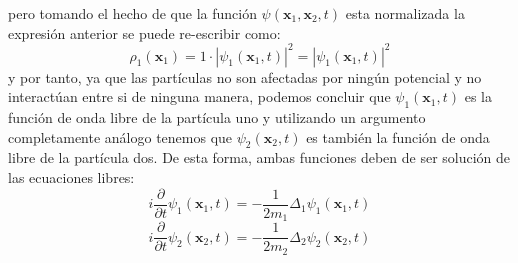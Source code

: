 \documentclass[12pt]{book}
\numberwithin{equation}{chapter}
\def\x{\mathbf{x}}
\begin{document}
pero tomando el hecho de que la funci\'on $\psi( \x_{1},\x_{2},t )$ esta normalizada la expresi\'on anterior se puede re-escribir como:
\begin{equation}
\rho_{1}(\x_{1})= 1 \cdot |\psi_{1}(\x_{1},t)|^{2} = |\psi_{1}(\x_{1},t)|^{2}
\end{equation}
y por tanto, ya que las part\'iculas no son afectadas por ning\'un potencial y no interact\'uan entre si de ninguna manera, podemos concluir que $\psi_{1}(\x_{1},t)$ es la funci\'on de onda libre de la part\'icula uno y utilizando un argumento completamente an\'alogo tenemos que $\psi_{2}(\x_{2},t)$ es tambi\'en la funci\'on de onda libre de la part\'icula dos. De esta forma, ambas funciones deben de ser soluci\'on de las ecuaciones libres:
\begin{equation}\label{lib1}
 i \frac{\partial}{ \partial t } \psi_{1} (\x_{1},t)= -  \frac{1}{2m_{1}} \Delta_{1} \psi_{1} (\x_{1},t)
\end{equation}
\begin{equation}\label{lib2}
i \frac{\partial}{ \partial t } \psi_{2} (\x_{2},t)= -  \frac{1}{2m_{2}} \Delta_{2} \psi_{2} (\x_{2},t)
\end{equation}
\end{document}
